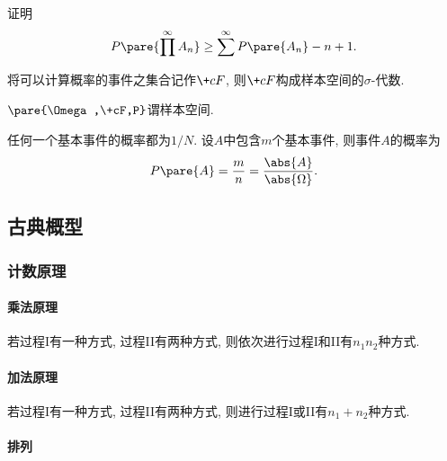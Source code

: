 \documentclass{ctexart}
\begin{document}
\begin{sample}
    \begin{ex}
        证明
        \[ P\pare{\prod^\infty A_n} \ge \sum^\infty P\pare{A_n} - n+1. \]
    \end{ex}
\end{sample}
\begin{remark}
    将可以计算概率的事件之集合记作$\+cF$, 则$\+cF$构成样本空间的$\sigma$-代数.
\end{remark}
\begin{definition}[概率空间]
    $\pare{\Omega,\+cF,P}$谓样本空间.
\end{definition}
\begin{corollary}
    任何一个基本事件的概率都为$1/N$. 设$A$中包含$m$个基本事件, 则事件$A$的概率为
\[ P\pare{A} = \frac{m}{n} = \frac{\abs{A}}{\abs{\Omega}}. \]
\end{corollary}



\subsection{古典概型} %
\label{sub:古典概型}

\subsubsection{计数原理} %
\label{ssub:计数原理}

\paragraph{乘法原理} %
\label{par:乘法原理}

若过程I有一种方式, 过程II有两种方式, 则依次进行过程I和II有$n_1n_2$种方式.


\paragraph{加法原理} %
\label{par:加法原理}

若过程I有一种方式, 过程II有两种方式, 则进行过程I或II有$n_1 + n_2$种方式.


\paragraph{排列} %
\label{par:排列}
\end{document}
